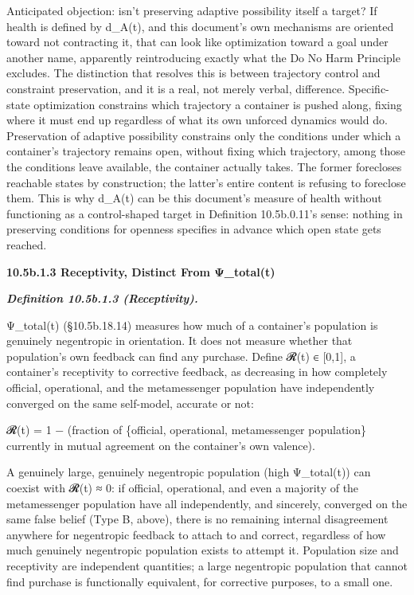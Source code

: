 \documentclass[
]{article}
\begin{document}
Anticipated objection: isn't preserving adaptive possibility itself a
target? If health is defined by d\_A(t), and this document's own
mechanisms are oriented toward not contracting it, that can look like
optimization toward a goal under another name, apparently reintroducing
exactly what the Do No Harm Principle excludes. The distinction that
resolves this is between trajectory control and constraint preservation,
and it is a real, not merely verbal, difference. Specific-state
optimization constrains which trajectory a container is pushed along,
fixing where it must end up regardless of what its own unforced dynamics
would do. Preservation of adaptive possibility constrains only the
conditions under which a container's trajectory remains open, without
fixing which trajectory, among those the conditions leave available, the
container actually takes. The former forecloses reachable states by
construction; the latter's entire content is refusing to foreclose them.
This is why d\_A(t) can be this document's measure of health without
functioning as a control-shaped target in Definition 10.5b.0.11's sense:
nothing in preserving conditions for openness specifies in advance which
open state gets reached.

\textbf{10.5b.1.3 Receptivity, Distinct From Ψ\_total(t)}

\emph{\textbf{Definition 10.5b.1.3 (Receptivity).}}

Ψ\_total(t) (§10.5b.18.14) measures how much of a container's population
is genuinely negentropic in orientation. It does not measure whether
that population's own feedback can find any purchase. Define 𝓡(t) ∈
{[}0,1{]}, a container's receptivity to corrective feedback, as
decreasing in how completely official, operational, and the
metamessenger population have independently converged on the same
self-model, accurate or not:

𝓡(t) = 1 − (fraction of \{official, operational, metamessenger
population\} currently in mutual agreement on the container's own
valence).

A genuinely large, genuinely negentropic population (high Ψ\_total(t))
can coexist with 𝓡(t) ≈ 0: if official, operational, and even a majority
of the metamessenger population have all independently, and sincerely,
converged on the same false belief (Type B, above), there is no
remaining internal disagreement anywhere for negentropic feedback to
attach to and correct, regardless of how much genuinely negentropic
population exists to attempt it. Population size and receptivity are
independent quantities; a large negentropic population that cannot find
purchase is functionally equivalent, for corrective purposes, to a small
one.
\end{document}
